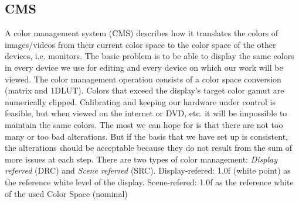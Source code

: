 \subsection{CMS}%
\label{sub:cms}

A color management system (CMS) describes how it translates the colors of images/videos from their current color space to the color space of the other devices, i.e. monitors. The basic problem is to be able to display the same colors in every device we use for editing and every device on which our work will be viewed. The color management operation consists of a color space conversion (matrix and 1DLUT). Colors that exceed the display's target color gamut are numerically clipped. Calibrating and keeping our hardware under control is feasible, but when viewed on the internet or DVD, etc. it will be impossible to maintain the same colors. The most we can hope for is that there are not too many or too bad alterations. But if the basis that we have set up is consistent, the alterations should be acceptable because they do not result from the sum of more issues at each step. There are two types of color management: \textit{Display referred} (DRC) and \textit{Scene referred} (SRC). Display-refered: 1.0f (white point) as the reference white level of the display. Scene-refered: 1.0f as the reference white of the used Color Space (nominal)

